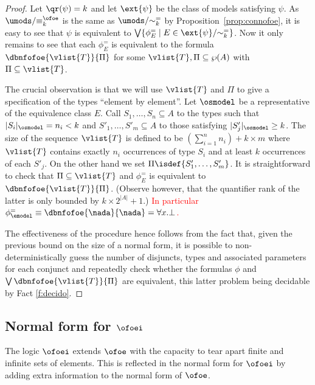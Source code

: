 \begin{proof}
Let $\qr(\psi) = k$ and let $\ext{\psi}$ be the class of models satisfying 
$\psi$.
As $\umods/{\equiv_k^{\ofoe}}$ is the same as $\umods/{\sim_k^=}$ by
Proposition~\ref{prop:connofoe}, it is easy to see that $\psi$ is equivalent to 
$\bigvee \{ \phi^=_E \mid E \in \ext{\psi}/{\sim_k^=} \}$.
Now it only remains to see that each $\phi^=_E$ is equivalent to the formula
$\dbnfofoe{\vlist{T}}{\Pi}$ for some $\vlist{T},\Pi \subseteq \wp(A)$ with
$\Pi \subseteq \vlist{T}$.

The crucial observation is that we will use $\vlist{T}$ and $\Pi$ to give a 
specification of the types ``element by element''. 
Let $\osmodel$ be a representative of the equivalence class $E$. 
Call $S_1,\dots,S_n \subseteq A$ to the types such that $|S_i|_\osmodel = n_i 
< k$ and $S'_1,\dots,S'_m \subseteq A$ to those satisfying $|S'_j|_\osmodel 
\geq k$. 
The size of the sequence $\vlist{T}$ is defined to be $(\sum_{i=1}^n n_i) + 
k\times m$ where $\vlist{T}$ contains exactly $n_i$ occurrences of type $S_i$ 
and at least $k$ occurrences of each $S'_j$.
On the other hand we set $\Pi \isdef \{S'_1,\dots,S'_m\}$. 
It is straightforward to check that $\Pi \subseteq \vlist{T}$ and $\phi^=_E$ is
equivalent to $\dbnfofoe{\vlist{T}}{\Pi}$. (Observe however, that the quantifier rank of the latter is only bounded by
$k\times 2^{|A|} + 1$.) 
\textcolor{red}{In particular $\phi^=_\emodel \equiv \dbnfofoe{\nada}{\nada} = \forall x. \bot$.}


The effectiveness of the procedure hence follows from the fact that, given the previous bound on the size of a normal form, it is possible to
non-deterministically guess the number of disjuncts, types and associated parameters for each conjunct and repeatedly check whether the formulas $\phi$
and    $\bigvee \dbnfofoe{\vlist{T}}{\Pi}$ are equivalent,  this latter problem being decidable by Fact \ref{f:decido}.
\end{proof}



\subsection{Normal form for $\ofoei$}

The logic $\ofoei$ extends $\ofoe$ with the capacity to tear apart finite and 
infinite sets of elements. 
This is reflected in the normal form for $\ofoei$ by adding extra information
to the normal form of $\ofoe$.

